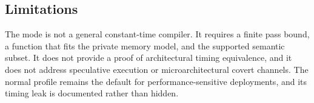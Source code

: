 \subsection{Limitations}

The mode is not a general constant-time compiler. It requires a finite pass
bound, a function that fits the private memory model, and the supported semantic
subset. It does not provide a proof of architectural timing equivalence, and it
does not address speculative execution or microarchitectural covert channels.
The normal profile remains the default for performance-sensitive deployments, and
its timing leak is documented rather than hidden.
